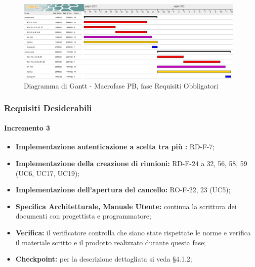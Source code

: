 \begin{landscape}
	\begin{figure}
	\includegraphics[width=\linewidth]{images/PB_obbligatori.png}
    \caption{Diagramma di Gantt - Macrofase PB, fase Requisiti Obbligatori}
	\end{figure}
\end{landscape}

\subsubsection{Requisiti Desiderabili}
\paragraph{Incremento 3}
\begin{itemize}
    \item \textbf{Implementazione autenticazione a scelta tra più :} RD-F-7;
    \item \textbf{Implementazione della creazione di riunioni:} RD-F-24 a 32, 56, 58, 59 (UC6, UC17, UC19);
    \item \textbf{Implementazione dell'apertura del cancello:} RO-F-22, 23 (UC5);
    \item \textbf{Specifica Architetturale, Manuale Utente:} continua la scrittura dei documenti con progettista e programmatore;
    \item \textbf{Verifica:} il verificatore controlla che siano state rispettate le norme e verifica il materiale scritto e il prodotto realizzato durante questa fase;
    \item \textbf{Checkpoint:} per la descrizione dettagliata si veda §4.1.2;
\end{itemize}

